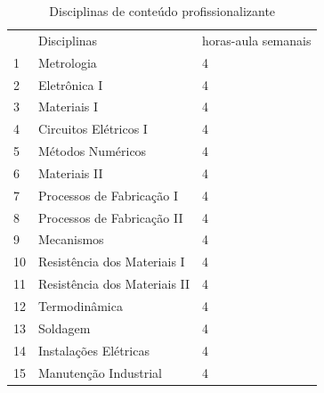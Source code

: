 \documentclass{paper}
\begin{document}
\else
    \begin{longtable}{|p{0.8cm}|p{7.5cm}|p{2.0cm}|}
    \caption{Disciplinas de conteúdo profissionalizante}\label{tab6} 
    \vspace{-0.25cm}
    \\ \hline 
    \cellcolor{\cinza} & \cellcolor{\cinza}Disciplinas & \cellcolor{\cinza}horas-aula semanais  \\ 
    \hline
     1 &  Metrologia  &  4 \\ \hline
     2 &  Eletrônica I  &  4 \\ \hline
     3 &  Materiais I  &  4 \\ \hline
     4 &  Circuitos Elétricos I  &  4 \\ \hline
     5 &  Métodos Numéricos  &  4 \\ \hline
     6 &  Materiais II  &  4 \\ \hline
     7 &  Processos de Fabricação I  &  4 \\ \hline
     8 &  Processos de Fabricação II  &  4 \\ \hline
     9 &  Mecanismos  &  4 \\ \hline
     10 &  Resistência dos Materiais I  &  4 \\ \hline
     11 &  Resistência dos Materiais II  &  4 \\ \hline
     12 &  Termodinâmica  &  4 \\ \hline
     13 &  Soldagem  &  4 \\ \hline
     14 &  Instalações Elétricas  &  4 \\ \hline
     15 &  Manutenção Industrial  &  4 \\ \hline

\end{longtable}
\end{document}

